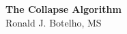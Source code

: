 \thispagestyle{empty}
\vspace*{\fill}
\begin{center}
    \Huge\textbf{The Collapse Algorithm} \\
    \vspace{1cm}
    \Large Ronald J. Botelho, MS
\end{center}
\vspace*{\fill}
\clearpage

